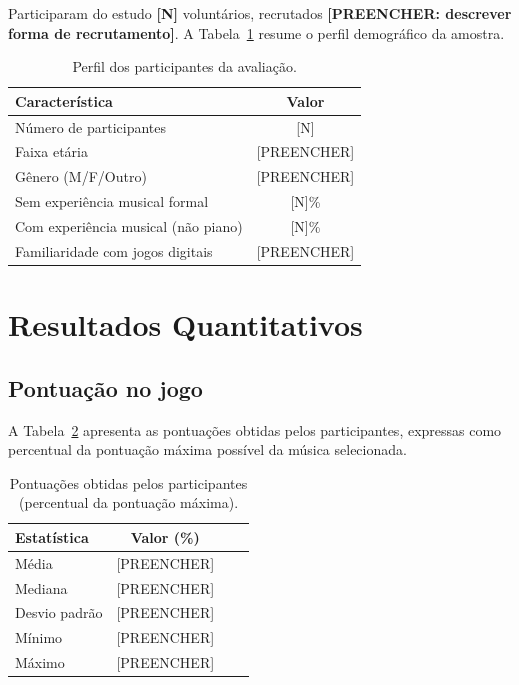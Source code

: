 \documentclass[
  12pt,
  openright,
  twoside,
  a4paper,
  english,
  brazil
]{abntex2}
\begin{document}
Participaram do estudo \textbf{[N]} voluntários, recrutados
\textbf{[PREENCHER: descrever forma de recrutamento]}.
A Tabela~\ref{tab:participantes} resume o perfil demográfico da amostra.

\begin{table}[htbp]
  \centering
  \caption{Perfil dos participantes da avaliação.}
  \label{tab:participantes}
  \begin{tabular}{@{}lc@{}}
    \toprule
    \textbf{Característica} & \textbf{Valor} \\
    \midrule
    Número de participantes          & [N]  \\
    Faixa etária                     & [PREENCHER] \\
    Gênero (M/F/Outro)               & [PREENCHER] \\
    Sem experiência musical formal   & [N]\% \\
    Com experiência musical (não piano) & [N]\% \\
    Familiaridade com jogos digitais & [PREENCHER] \\
    \bottomrule
  \end{tabular}
\end{table}

\section{Resultados Quantitativos}

\subsection{Pontuação no jogo}

A Tabela~\ref{tab:pontuacoes} apresenta as pontuações obtidas pelos
participantes, expressas como percentual da pontuação máxima possível
da música selecionada.

\begin{table}[htbp]
  \centering
  \caption{Pontuações obtidas pelos participantes (percentual da
           pontuação máxima).}
  \label{tab:pontuacoes}
  \begin{tabular}{@{}lccc@{}}
    \toprule
    \textbf{Estatística} & \textbf{Valor (\%)} \\
    \midrule
    Média    & [PREENCHER] \\
    Mediana  & [PREENCHER] \\
    Desvio padrão & [PREENCHER] \\
    Mínimo   & [PREENCHER] \\
    Máximo   & [PREENCHER] \\
    \bottomrule
  \end{tabular}
\end{table}
\end{document}

